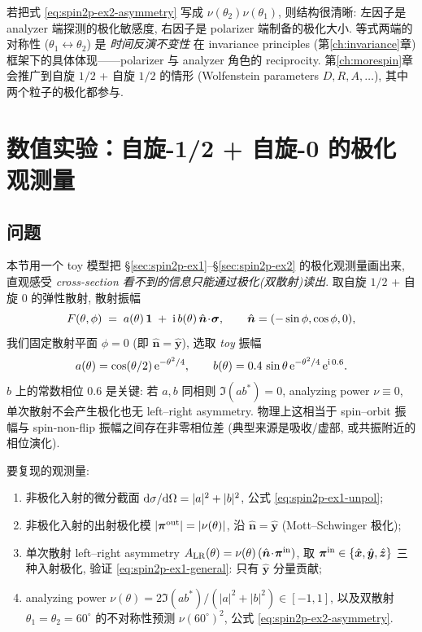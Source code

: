 \begin{remark}
若把式 \eqref{eq:spin2p-ex2-asymmetry} 写成 $\nu(\theta_2)\nu(\theta_1)$, 则结构很清晰: 左因子是 analyzer 端探测的极化敏感度, 右因子是 polarizer 端制备的极化大小. 等式两端的对称性 ($\theta_1\leftrightarrow\theta_2$) 是 \emph{时间反演不变性} 在 invariance principles (第\ref{ch:invariance}章) 框架下的具体体现——polarizer 与 analyzer 角色的 reciprocity. 第\ref{ch:morespin}章会推广到自旋 $1/2$ + 自旋 $1/2$ 的情形 (Wolfenstein parameters $D, R, A,\dots$), 其中两个粒子的极化都参与.
\end{remark}

\section{数值实验：自旋-1/2 + 自旋-0 的极化观测量}\label{sec:numexp-ch04}

\subsection*{问题}
本节用一个 toy 模型把 \S\ref{sec:spin2p-ex1}--\S\ref{sec:spin2p-ex2} 的极化观测量画出来, 直观感受 \emph{cross-section 看不到的信息只能通过极化(双散射)读出}. 取自旋 $1/2$ + 自旋 $0$ 的弹性散射, 散射振幅
\begin{equation*}
  F(\theta,\phi)\;=\;a(\theta)\,\mathbf 1\;+\;\mathrm{i}\,b(\theta)\,\hat{\bm n}\!\cdot\!\bm\sigma,
  \qquad \hat{\bm n}=(-\sin\phi,\cos\phi,0),
\end{equation*}
我们固定散射平面 $\phi=0$ (即 $\hat{\bm n}=\hat{\bm y}$), 选取 \emph{toy} 振幅
\begin{equation*}
  a(\theta)=\cos(\theta/2)\,\mathrm{e}^{-\theta^2/4},\qquad
  b(\theta)=0.4\,\sin\theta\,\mathrm{e}^{-\theta^2/4}\,\mathrm{e}^{\mathrm{i}\,0.6}.
\end{equation*}
$b$ 上的常数相位 $0.6$ 是关键: 若 $a,b$ 同相则 $\Im(ab^*)=0$, analyzing power $\nu\equiv 0$, 单次散射不会产生极化也无 left--right asymmetry. 物理上这相当于 spin--orbit 振幅与 spin-non-flip 振幅之间存在非零相位差 (典型来源是吸收/虚部, 或共振附近的相位演化).

要复现的观测量:
\begin{enumerate}\itemsep=2pt
  \item[(A)] 非极化入射的微分截面 $\mathrm{d}\sigma/\mathrm{d}\Omega = |a|^2+|b|^2$, 公式 \eqref{eq:spin2p-ex1-unpol};
  \item[(B)] 非极化入射的出射极化模 $|\bm\pi^{\rm out}|=|\nu(\theta)|$, 沿 $\hat{\bm n}=\hat{\bm y}$ (Mott--Schwinger 极化);
  \item[(C)] 单次散射 left--right asymmetry $A_{\rm LR}(\theta)=\nu(\theta)\,(\hat{\bm n}\!\cdot\!\bm\pi^{\rm in})$, 取 $\bm\pi^{\rm in}\in\{\hat{\bm x},\hat{\bm y},\hat{\bm z}\}$ 三种入射极化, 验证 \eqref{eq:spin2p-ex1-general}: 只有 $\hat{\bm y}$ 分量贡献;
  \item[(D)] analyzing power $\nu(\theta)=2\Im(ab^*)/(|a|^2+|b|^2)\in[-1,1]$, 以及双散射 $\theta_1=\theta_2=60^\circ$ 的不对称性预测 $\nu(60^\circ)^2$, 公式 \eqref{eq:spin2p-ex2-asymmetry}.
\end{enumerate}


